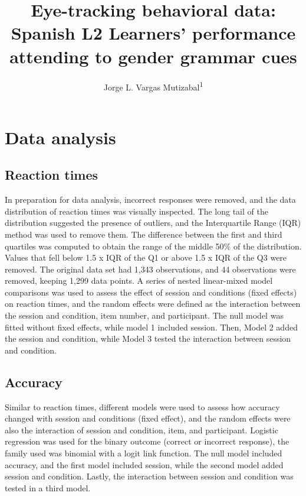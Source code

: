 \documentclass[
  man,floatsintext]{apa6}
\title{Eye-tracking behavioral data: Spanish L2 Learners' performance attending to gender grammar cues}
\author{Jorge L. Vargas Mutizabal\textsuperscript{1}}
\date{}
\affiliation{\vspace{0.5cm}\textsuperscript{1} Rutgers - The State University of New Jersey\\\textsuperscript{} }
\begin{document}
\maketitle

\section{Data analysis}\label{data-analysis}

\subsection{Reaction times}\label{reaction-times}

In preparation for data analysis, incorrect responses were removed, and the data distribution of reaction times was visually inspected. The long tail of the distribution suggested the presence of outliers, and the Interquartile Range (IQR) method was used to remove them. The difference between the first and third quartiles was computed to obtain the range of the middle 50\% of the distribution. Values that fell below 1.5 x IQR of the Q1 or above 1.5 x IQR of the Q3 were removed. The original data set had 1,343 observations, and 44 observations were removed, keeping 1,299 data points.
A series of nested linear-mixed model comparisons was used to assess the effect of session and conditions (fixed effects) on reaction times, and the random effects were defined as the interaction between the session and condition, item number, and participant. The null model was fitted without fixed effects, while model 1 included session. Then, Model 2 added the session and condition, while Model 3 tested the interaction between session and condition.

\subsection{Accuracy}\label{accuracy}

Similar to reaction times, different models were used to assess how accuracy changed with session and conditions (fixed effect), and the random effects were also the interaction of session and condition, item, and participant. Logistic regression was used for the binary outcome (correct or incorrect response), the family used was binomial with a logit link function. The null model included accuracy, and the first model included session, while the second model added session and condition. Lastly, the interaction between session and condition was tested in a third model.
\end{document}
